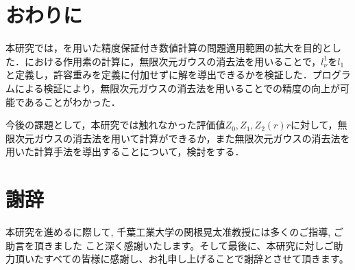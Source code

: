 
\chapter{おわりに}

本研究では，\rad{}を用いた精度保証付き数値計算の問題適用範囲の拡大を目的とした．\rad{}における作用素の計算に，無限次元ガウスの消去法を用いることで，$l_\nu^1$を$l_1$と定義し，許容重みを定義に付加せずに解を導出できるかを検証した．プログラムによる検証により，無限次元ガウスの消去法を用いることで\rad{}の精度の向上が可能であることがわかった．

今後の課題として，本研究では触れなかった評価値$Z_0, Z_1, Z_2(r)r$に対して，無限次元ガウスの消去法を用いて計算ができるか，また無限次元ガウスの消去法を用いた計算手法を導出することについて，検討をする．

\chapter*{謝辞}
本研究を進めるに際して, 千葉工業大学の関根晃太准教授には多くのご指導, ご助言を頂きました
こと深く感謝いたします。そして最後に、本研究に対しご助力頂いたすべての皆様に感謝し、お礼申し上げることで謝辞とさせて頂きます。
